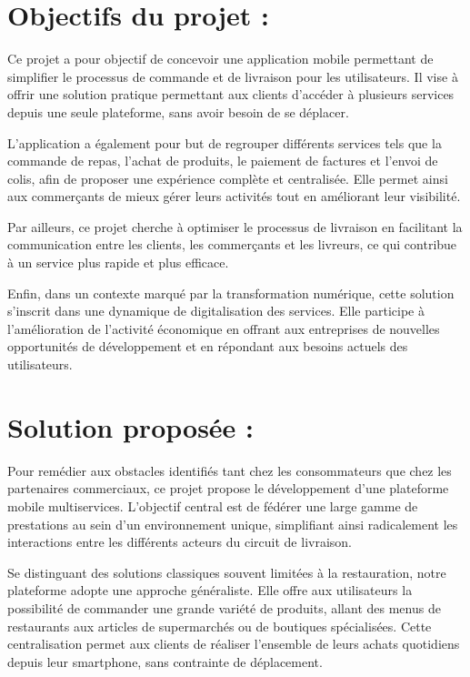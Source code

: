 \documentclass[12pt,fleqn,a4paper]{report}
\begin{document}
\begin{justify}
\section{Objectifs du projet :}
Ce projet a pour objectif de concevoir une application mobile permettant de simplifier le processus de commande et de livraison pour les utilisateurs. Il vise à offrir une solution pratique permettant aux clients d'accéder à plusieurs services depuis une seule plateforme, sans avoir besoin de se déplacer.

L'application a également pour but de regrouper différents services tels que la commande de repas, l'achat de produits, le paiement de factures et l'envoi de colis, afin de proposer une expérience complète et centralisée. Elle permet ainsi aux commerçants de mieux gérer leurs activités tout en améliorant leur visibilité.

Par ailleurs, ce projet cherche à optimiser le processus de livraison en facilitant la communication entre les clients, les commerçants et les livreurs, ce qui contribue à un service plus rapide et plus efficace.

Enfin, dans un contexte marqué par la transformation numérique, cette solution s'inscrit dans une dynamique de digitalisation des services. Elle participe à l'amélioration de l'activité économique en offrant aux entreprises de nouvelles opportunités de développement et en répondant aux besoins actuels des utilisateurs.
\newpage
\section{Solution proposée :}
Pour remédier aux obstacles identifiés tant chez les consommateurs que chez les partenaires commerciaux, ce projet propose le développement d'une plateforme mobile multiservices. L'objectif central est de fédérer une large gamme de prestations au sein d'un environnement unique, simplifiant ainsi radicalement les interactions entre les différents acteurs du circuit de livraison.

\vspace{0.4cm}
Se distinguant des solutions classiques souvent limitées à la restauration, notre plateforme adopte une approche généraliste. Elle offre aux utilisateurs la possibilité de commander une grande variété de produits, allant des menus de restaurants aux articles de supermarchés ou de boutiques spécialisées. Cette centralisation permet aux clients de réaliser l'ensemble de leurs achats quotidiens depuis leur smartphone, sans contrainte de déplacement.


\end{justify}
\end{document}
